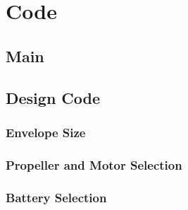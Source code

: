\documentclass[]{book}
\begin{document}






\pagebreak

\appendix


\chapter{Code}
\section{Main} \label{code:main}

\section{Design Code} \label{code:designCode}
\subsection{Envelope Size} \label{code:envelope}

\subsection{Propeller and Motor Selection} \label{code:motorSelect}

\subsection{Battery Selection} \label{code:batterySelect}

\end{document}
